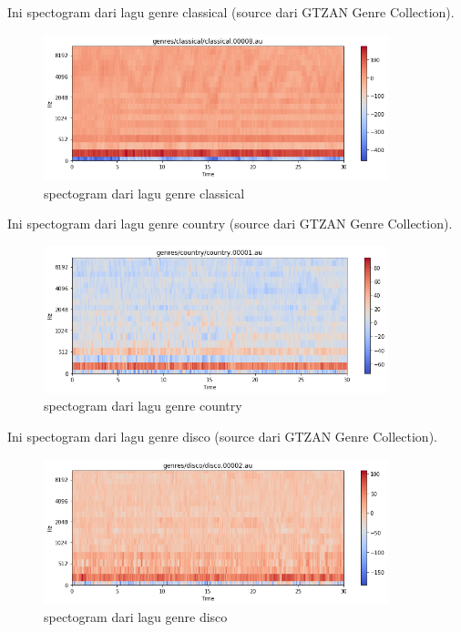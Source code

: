 Ini spectogram dari lagu genre classical (source dari GTZAN Genre Collection).

\begin{figure}[H]
	\centering
	\includegraphics[width=10cm]{figures/1174083/figures6/13.png}
	\caption{spectogram dari lagu genre classical}
\end{figure}

Ini spectogram dari lagu genre country (source dari GTZAN Genre Collection).

\begin{figure}[H]
	\centering
	\includegraphics[width=10cm]{figures/1174083/figures6/14.png}
	\caption{spectogram dari lagu genre country}
\end{figure}

Ini spectogram dari lagu genre disco (source dari GTZAN Genre Collection).

\begin{figure}[H]
	\centering
	\includegraphics[width=10cm]{figures/1174083/figures6/15.png}
	\caption{spectogram dari lagu genre disco}
\end{figure}

